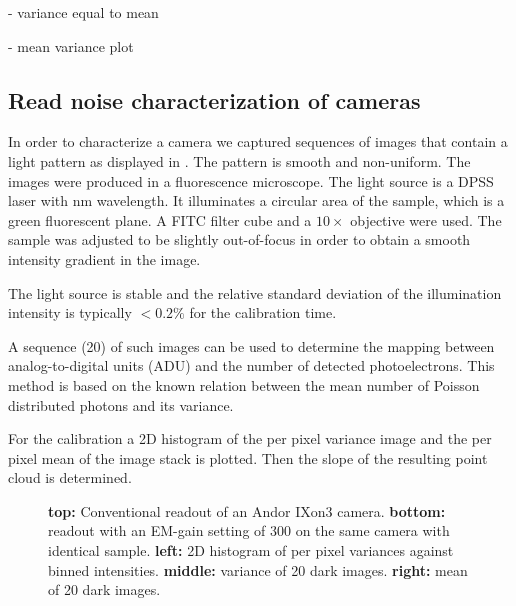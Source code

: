 - variance equal to mean

- mean variance plot

\subsection{Read noise characterization of cameras}

In order to characterize a camera we captured sequences of images that
contain a light pattern as displayed in . The
pattern is smooth and non-uniform.  
  The images were produced in a
fluorescence microscope. The light source is a DPSS laser with
\unit[473]{nm} wavelength. It illuminates a circular area of the
sample, which is a green fluorescent plane. A FITC filter cube and a
$10\times$ objective were used. The sample was adjusted to be slightly
out-of-focus in order to obtain a smooth intensity gradient in the
image.

The light source is stable and the relative standard deviation of the
illumination intensity is typically $<0.2\%$ for the calibration
time. 

A sequence (20) of such images can be used to determine the mapping
between analog-to-digital units (ADU)
 and the number of detected
photoelectrons. This method is based on the known relation between the
mean number of Poisson distributed photons and its variance.

For the calibration a 2D histogram of the per pixel
variance image and the per pixel mean of the image stack is
plotted. Then the slope of the resulting point cloud is determined.

\begin{figure}
  \centering
  \caption{{\bf top:} Conventional readout of an Andor IXon3
    camera. {\bf bottom:} readout with an EM-gain setting of 300 on
    the same camera with identical sample. {\bf left:} 2D histogram of
    per pixel variances against binned intensities. {\bf middle:}
    variance of 20 dark images. {\bf right:} mean of 20 dark images.}
  \label{fig:ixon}
\end{figure}
  
